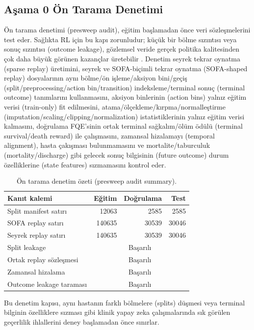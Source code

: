 \documentclass[conference]{IEEEtran}
\begin{document}
\subsection{Aşama 0 Ön Tarama Denetimi}
Ön tarama denetimi (presweep audit), eğitim başlamadan önce veri sözleşmelerini test eder. Sağlıkta RL için bu kapı zorunludur; küçük bir bölme sızıntısı veya sonuç sızıntısı (outcome leakage), gözlemsel veride gerçek politika kalitesinden çok daha büyük görünen kazançlar üretebilir \cite{gottesman2019guidelines}. Denetim seyrek tekrar oynatma (sparse replay) üretimini, seyrek ve SOFA-biçimli tekrar oynatma (SOFA-shaped replay) dosyalarının aynı bölme/ön işleme/aksiyon bini/geçiş (split/preprocessing/action bin/transition) indeksleme/terminal sonuç (terminal outcome) tanımlarını kullanmasını, aksiyon binlerinin (action bins) yalnız eğitim verisi (train-only) fit edilmesini, atama/ölçekleme/kırpma/normalleştirme (imputation/scaling/clipping/normalization) istatistiklerinin yalnız eğitim verisi kalmasını, doğrulama FQE'sinin ortak terminal sağkalım/ölüm ödülü (terminal survival/death reward) ile çalışmasını, zamansal hizalamayı (temporal alignment), hasta çakışması bulunmamasını ve mortalite/taburculuk (mortality/discharge) gibi gelecek sonuç bilgisinin (future outcome) durum özelliklerine (state features) sızmamasını kontrol eder.

\begin{table}[t]
\centering
\caption{Ön tarama denetim özeti (presweep audit summary).}
\label{tab:audit}
\begin{tabular}{lrrr}
\toprule
Kanıt kalemi & Eğitim & Doğrulama & Test \\
\midrule
Split manifest satırı & 12063 & 2585 & 2585 \\
SOFA replay satırı & 140635 & 30539 & 30046 \\
Seyrek replay satırı & 140635 & 30539 & 30046 \\
\midrule
Split leakage & \multicolumn{3}{c}{Başarılı} \\
Ortak replay sözleşmesi & \multicolumn{3}{c}{Başarılı} \\
Zamansal hizalama & \multicolumn{3}{c}{Başarılı} \\
Outcome leakage taraması & \multicolumn{3}{c}{Başarılı} \\
\bottomrule
\end{tabular}
\end{table}

Bu denetim kapısı, aynı hastanın farklı bölmelere (splits) düşmesi veya terminal bilginin özelliklere sızması gibi klinik yapay zeka çalışmalarında sık görülen geçerlilik ihlallerini deney başlamadan önce sınırlar.
\end{document}
